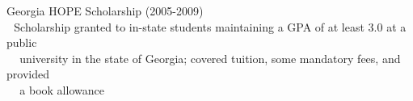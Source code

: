 \indent\hspace{0.2 cm}Georgia HOPE Scholarship (2005-2009)\\ %
\indent\hspace{0.2 cm}\hspace{0.6 cm}\textbullet\,\, Scholarship granted to in-state students maintaining a GPA of at least 3.0 at a public\\
\indent\hspace{0.2 cm}\hspace{0.6 cm}\,\,\,\,\,\,\,university in the state of Georgia; covered tuition, some mandatory fees, and provided\\
\indent\hspace{0.2 cm}\hspace{0.6 cm}\,\,\,\,\,\,\,a book allowance\\

%
%

